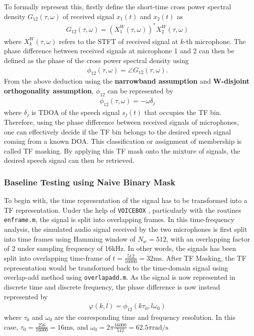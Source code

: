 \documentclass[a4paper,twoside,12pt,hidelinks]{article}
\begin{document}
To formally represent this, firstly define the short-time cross power spectral density $G_{12}(\tau,\omega)$ of received signal $x_1(t)$ and $x_2(t)$ as 
\begin{align}
G_{12}(\tau,\omega) = (X^W_1(\tau,\omega))^*X^W_2(\tau,\omega)
\end{align}
where $X^W_k(\tau,\omega)$ refers to the STFT of received signal at $k$-th microphone. The phase difference between received signals at microphone 1 and 2 can then be defined as the phase of the cross power spectral density using
\begin{align}
\phi_{12}(\tau,\omega) = \angle G_{12}(\tau,\omega).
\end{align}
From the above deduction using the \textbf{narrowband assumption} and \textbf{W-disjoint orthogonality assumption}, $\phi_{12}$ can be represented by
\begin{align}
\phi_{12}(\tau,\omega) = -\omega\delta_j \label{eq:phasediff}
\end{align}
where $\delta_j$ is TDOA of the speech signal $s_j(t)$ that occupies the TF bin. Therefore, using the phase difference between received signals of microphones, one can effectively decide if the TF bin belongs to the desired speech signal coming from a known DOA. This classification or assignment of membership is called TF masking. By applying this TF mask onto the mixture of signals, the desired speech signal can then be retrieved. 

\subsubsection{Baseline Testing using Naive Binary Mask}
To begin with, the time representation of the signal has to be transformed into a TF representation. Under the help of \texttt{VOICEBOX} \cite{Brookes1997VOICEBOX:MATLAB.}, particularly with the routines \texttt{enframe.m}, the signal is split into overlapping frames. In this time-frequency analysis, the simulated audio signal received by the two microphones is first split into time frames using Hamming window of $N_w = 512$, with an overlapping factor of 2 under sampling frequency of 16kHz. In other words, the signals has been split into overlapping time-frame of $t=\frac{512}{16000}=32$ms. After TF Masking, the TF representation would be transformed back to the time-domain signal using overlap-add method using \texttt{overlapadd.m}. As the signal is now represented in discrete time and discrete frequency, the phase difference is now instead represented by 
\begin{align}
\varphi(k,l)=\phi_{12}(k\tau_0,l\omega_0)
\end{align}
where $\tau_0$ and $\omega_0$ are the corresponding time and frequency resolution. In this case, $\tau_0=\frac{256}{16000}=16\text{ms}$, and $\omega_0=2\pi\frac{16000}{512}=62.5\pi\text{rad/s}$
\end{document}
